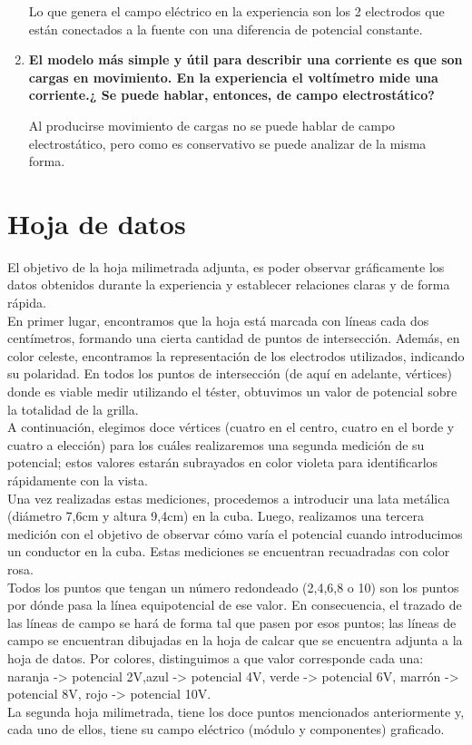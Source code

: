 \documentclass{article}
\begin{document}
\begin{enumerate}
        Lo que genera el campo eléctrico en la experiencia son los 2 electrodos que están 
        conectados a la fuente con una diferencia de potencial constante.

        \item \textbf{El modelo más simple y útil para describir una corriente es que son 
        cargas en movimiento. En la experiencia el voltímetro mide una corriente.¿ Se puede 
        hablar, entonces, de campo electrostático?}
        
        Al producirse movimiento de cargas no se puede hablar de campo electrostático, pero 
        como es conservativo se puede analizar de la misma forma. 

	\end{enumerate}

\section{Hoja de datos}
El objetivo de la hoja milimetrada adjunta, es poder observar gráficamente los datos obtenidos durante la experiencia y establecer relaciones claras y de forma rápida.\\
En primer lugar, encontramos que la hoja está marcada con líneas cada dos centímetros, formando una cierta cantidad de puntos de intersección. Además, en color celeste, encontramos la representación de los electrodos utilizados, indicando su polaridad.
En todos los puntos de intersección (de aquí en adelante, vértices) donde es viable medir utilizando el téster, obtuvimos un valor de potencial sobre la totalidad de la grilla.\\
A continuación, elegimos doce vértices (cuatro en el centro, cuatro en el borde y cuatro a elección) para los cuáles realizaremos una segunda medición de su potencial; estos valores estarán subrayados en color violeta para identificarlos rápidamente con la vista.\\
Una vez realizadas estas mediciones, procedemos a introducir una lata metálica (diámetro 7,6cm y altura 9,4cm) en la cuba. Luego, realizamos una tercera medición con el objetivo de observar cómo varía el potencial cuando introducimos un conductor en la cuba. Estas mediciones se encuentran recuadradas con color rosa.\\
Todos los puntos que tengan un número redondeado (2,4,6,8 o 10) son los puntos por dónde pasa la línea equipotencial de ese valor. En consecuencia, el trazado de las líneas de campo se hará de forma tal que pasen por esos puntos; las líneas de campo se encuentran dibujadas en la hoja de calcar que se encuentra adjunta a la hoja de datos. Por colores, distinguimos a que valor corresponde cada una: naranja -> potencial 2V,azul -> potencial 4V, verde -> potencial 6V, marrón -> potencial 8V, rojo -> potencial 10V.\\
La segunda hoja milimetrada, tiene los doce puntos mencionados anteriormente y, cada uno de ellos, tiene su campo eléctrico (módulo y componentes) graficado.
\end{document}
